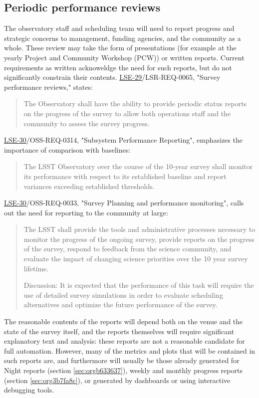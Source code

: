 \subsection{Periodic performance reviews}
\label{sec:orgfcf3503}
The observatory staff and scheduling team will need to report progress and strategic concerns to management, funding agencies, and the community as a whole.
These review may take the form of presentations (for example at the yearly Project and Community Workshop (PCW)) or written reports.
Current requirements as written acknoweldge the need for such reports, but do not significantly constrain their contents. 
\href{https://ls.st/lse-29}{LSE-29}/LSR-REQ-0065, "Survey performance reviews," states:
\begin{quote}
The Observatory shall have the ability to provide periodic status
reports on the progress of the survey to allow both operations staff
and the community to assess the survey progress.
\end{quote}
\href{https://ls.st/lse-30}{LSE-30}/OSS-REQ-0314, "Subsystem Performance Reporting", emphasizes the importance of comparison with baselines:
\begin{quote}
The LSST Observatory over the course of the 10-year survey shall monitor its performance with respect to its established baseline and report variances exceeding established thresholds.
\end{quote}
\href{https://ls.st/lse-30}{LSE-30}/OSS-REQ-0033, "Survey Planning and performance monitoring", calls out the need for reporting to the community at large:
\begin{quote}
The LSST shall provide the tools and administrative processes
necessary to monitor the progress of the ongoing survey, provide
reports on the progress of the survey, respond to feedback from the
science community, and evaluate the impact of changing science
priorities over the 10 year survey lifetime.

Discussion: It is expected that the performance of this task will
require the use of detailed survey simulations in order to evaluate
scheduling alternatives and optimize the future performance of the
survey.
\end{quote}

The reasonable contents of the reports will depend both on the venue and the state of the survey itself, and the reports themselves will require significant explanatory text and analysis: these reports are not a reasonable candidate for full automation.
However, many of the metrics and plots that will be contained in such reports are, and furthermore will usually be those already generated for Night reports (section \ref{sec:orgb633637}), weekly and monthly progress reports (section \ref{sec:org3b7fa8c}), or generated by dashboards or using interactive debugging tools.

